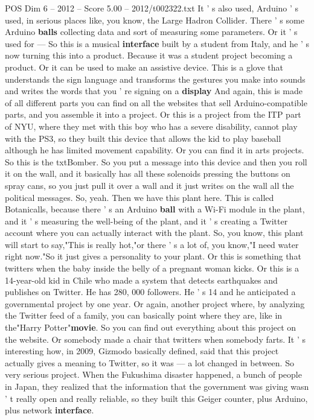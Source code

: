 \begin{textsample}{POS Dim 6 – 2012 – Score 5.00 – 2012/t002322.txt}
It ' s also used, Arduino ' s used, in serious places like, you know, the Large Hadron Collider.
There ' s some Arduino \textbf{balls} collecting data and sort of measuring some parameters.
Or it ' s used for — So this is a musical \textbf{interface} built by a student from Italy, and he ' s now turning this into a product.
Because it was a student project becoming a product.
Or it can be used to make an assistive device.
This is a glove that understands the sign language and transforms the gestures you make into sounds and writes the words that you ' re signing on a \textbf{display} And again, this is made of all different parts you can find on all the websites that sell Arduino-compatible parts, and you assemble it into a project.
Or this is a project from the ITP part of NYU, where they met with this boy who has a severe disability, cannot play with the PS3, so they built this device that allows the kid to play baseball although he has limited movement capability.
Or you can find it in arts projects.
So this is the txtBomber.
So you put a message into this device and then you roll it on the wall, and it basically has all these solenoids pressing the buttons on spray cans, so you just pull it over a wall and it just writes on the wall all the political messages.
So, yeah.
Then we have this plant here.
This is called Botanicalls, because there ' s an Arduino \textbf{ball} with a Wi-Fi module in the plant, and it ' s measuring the well-being of the plant, and it ' s creating a Twitter account where you can actually interact with the plant.
So, you know, this plant will start to say,"This is really hot,"or there ' s a lot of, you know,"I need water right now."So it just gives a personality to your plant.
Or this is something that twitters when the baby inside the belly of a pregnant woman kicks.
Or this is a 14-year-old kid in Chile who made a system that detects earthquakes and publishes on Twitter.
He has 280, 000 followers.
He ' s 14 and he anticipated a governmental project by one year.
Or again, another project where, by analyzing the Twitter feed of a family, you can basically point where they are, like in the"Harry Potter"\textbf{movie}.
So you can find out everything about this project on the website.
Or somebody made a chair that twitters when somebody farts.
It ' s interesting how, in 2009, Gizmodo basically defined, said that this project actually gives a meaning to Twitter, so it was — a lot changed in between.
So very serious project.
When the Fukushima disaster happened, a bunch of people in Japan, they realized that the information that the government was giving wasn ' t really open and really reliable, so they built this Geiger counter, plus Arduino, plus network \textbf{interface}.

\end{textsample}
